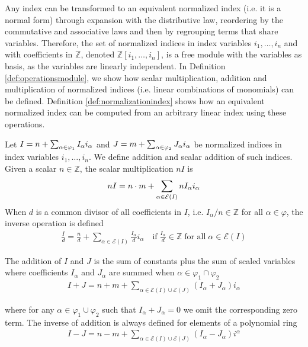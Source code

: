 Any index can be transformed to an equivalent normalized index (i.e. it is a normal form) through expansion with the distributive law, reordering by the commutative and associative laws and then by regrouping terms that share variables. Therefore, the set of normalized indices in index variables $i_1,\dots,i_n$ and with coefficients in $\mathbb{Z}$, denoted $\mathbb{Z}[i_1,\dots,i_n]$, is a free module with the variables as basis, as the variables are linearly independent. In Definition \ref{def:operationsmodule}, we show how scalar multiplication, addition and multiplication of normalized indices (i.e. linear combinations of monomials) can be defined. Definition \ref{def:normalizationindex} shows how an equivalent normalized index can be computed from an arbitrary linear index using these operations.
%
\begin{defi}\label{def:operationsmodule}
Let $I = \normlinearindex[\varphi_1]{n}{I}$ and $J = \normlinearindex[\varphi_2]{m}{J}$ be normalized indices in index variables $i_1,\dots,i_n$. We define addition and scalar addition of such indices. Given a scalar $n\in\mathbb{Z}$, the scalar multiplication $n I$ is
%
\begin{align*}
    n I = \normlinearindex[\mathcal{E}(I)]{n \cdot m}{n I}
\end{align*}
When $d$ is a common divisor of all coefficients in $I$, i.e. $I_\alpha / n \in \mathbb{Z}$ for all $\alpha\in\varphi$, the inverse operation is defined
\begin{align*}
    \frac{I}{d} = \frac{n}{d} + \sum_{\alpha\in \mathcal{E}(I)} \frac{I_\alpha}{d} i_\alpha\quad\text{if}\;\frac{I_\alpha}{d} \in \mathbb{Z}\;\text{for all}\;\alpha\in\mathcal{E}(I)
\end{align*}

The addition of $I$ and $J$ is the sum of constants plus the sum of scaled variables where coefficients $I_\alpha$ and $J_\alpha$ are summed when $\alpha\in\varphi_1 \cap \varphi_2$
\begin{align*}
    I + J = n + m + \sum_{\alpha \in \mathcal{E}(I) \cup \mathcal{E}(J)}(I_\alpha + J_\alpha)i_\alpha
\end{align*}

where for any $\alpha\in \varphi_1 \cup \varphi_2$ such that $I_\alpha + J_\alpha = 0$ we omit the corresponding zero term. The inverse of addition is always defined for elements of a polynomial ring
%
\begin{align*}
    I - J = n - m + \sum_{\alpha \in \mathcal{E}(I) \cup \mathcal{E}(J)}(I_\alpha - J_\alpha)i^\alpha
\end{align*}
\end{defi}
